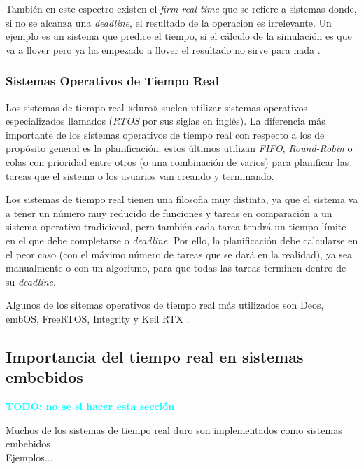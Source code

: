 También en este espectro existen el \textit{firm real time} que se refiere a sistemas donde, si no se alcanza una \textit{deadline}, el resultado de la operacion es irrelevante. Un ejemplo es un sistema que predice el tiempo, si el cálculo de la simulación es que va a llover pero ya ha empezado a llover el resultado no sirve para nada \cite{wang2017rtes}.

\subsubsection{Sistemas Operativos de Tiempo Real}
Los sistemas de tiempo real «duro» suelen utilizar sistemas operativos especializados llamados  (\textit{RTOS} por sus siglas en inglés). La diferencia más importante de los sistemas operativos de tiempo real con respecto a los de propósito general es la planificación. estos últimos utilizan \textit{FIFO}, \textit{Round-Robin} o colas con prioridad entre otros (o una combinación de varios) para planificar las tareas que el sistema o los usuarios van creando y terminando.

Los sistemas de tiempo real tienen una filosofia muy distinta, ya que el sistema va a tener un número muy reducido de funciones y tareas en comparación a un sistema operativo tradicional, pero también cada tarea tendrá un tiempo límite en el que debe completarse o \textit{deadline}. Por ello, la planificación debe calcularse en el peor caso (con el máximo número de tareas que se dará en la realidad), ya sea manualmente o con un algoritmo, para que todas las tareas terminen dentro de su \textit{deadline}.

Algunos de los sitemas operativos de tiempo real más utilizados son Deos, embOS, FreeRTOS, Integrity y Keil RTX \cite{lynx2024rtos}.

\subsection{Importancia del tiempo real en sistemas embebidos}
\textbf{\textcolor{cyan}{TODO: no se si hacer esta sección}} 

Muchos de los sistemas de tiempo real duro son implementados como sistemas embebidos\\

Ejemplos...

